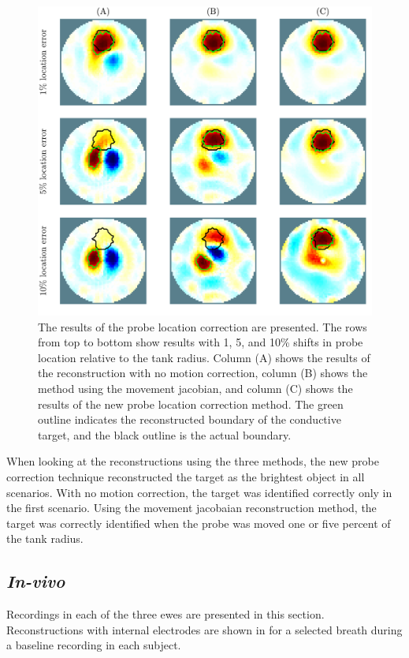 \begin{figure}
    \centering
	\includegraphics[width=\textwidth]{chapter7-internal_elec_motion/imgs/recon_accuracy_hollow.pdf} 
	\caption[Results of the probe location correction]{\label{fig:probe_location_correction} 
	The results of the probe location correction are presented. 
	The rows from top to bottom show results with 1, 5, and 10\% shifts in probe location 
	relative to the tank radius.
	Column (A) shows the results of the reconstruction  with no motion correction,
	column (B) shows the method using the movement jacobian, and 
	column (C) shows the results of the new probe location correction method.
	The green outline indicates the reconstructed boundary of the conductive target, 
	and the black outline is the actual boundary.}
\end{figure}

When looking at the reconstructions using the three methods, the new probe correction technique
reconstructed the target as the brightest object in all scenarios. With no motion correction, the 
target was identified correctly only in the first scenario. Using the movement jacobaian 
reconstruction method, the target was correctly identified when the probe was moved one or five percent
of the tank radius. 

\subsection{\emph{In-vivo}}
Recordings in each of the three ewes are presented in this section.
Reconstructions with internal electrodes are shown in
 for a selected breath during a 
baseline recording in each subject.

